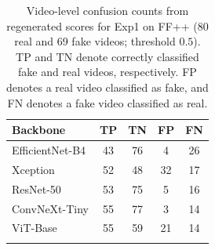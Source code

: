 \begin{table}[!htbp]
\caption{Video-level confusion counts from regenerated scores for Exp1 on FF++ (80 real and 69 fake videos; threshold $0.5$). TP and TN denote correctly classified fake and real videos, respectively. FP denotes a real video classified as fake, and FN denotes a fake video classified as real.}
\centering
\small
\setlength{\tabcolsep}{3pt}
\begin{tabular}{l cccc}
\toprule
\textbf{Backbone} & \textbf{TP} & \textbf{TN} & \textbf{FP} & \textbf{FN} \\
\midrule
EfficientNet-B4 & 43 & 76 & 4 & 26 \\
Xception & 52 & 48 & 32 & 17 \\
ResNet-50 & 53 & 75 & 5 & 16 \\
ConvNeXt-Tiny & 55 & 77 & 3 & 14 \\
ViT-Base & 55 & 59 & 21 & 14 \\
\botrule
\end{tabular}
\label{tab:confusion_exp1}
\end{table}
